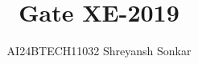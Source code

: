 \documentclass[journal]{IEEEtran}
\begin{document}

\vspace{3cm}

\title{Gate XE-2019}
\author{AI24BTECH11032 Shreyansh Sonkar}
{\let\newpage\relax\maketitle}

\renewcommand{\thefigure}{\theenumi}
\renewcommand{\thetable}{\theenumi}
\setlength{\intextsep}{10pt} %


\renewcommand{\thetable}{\theenumi}
\end{document}
